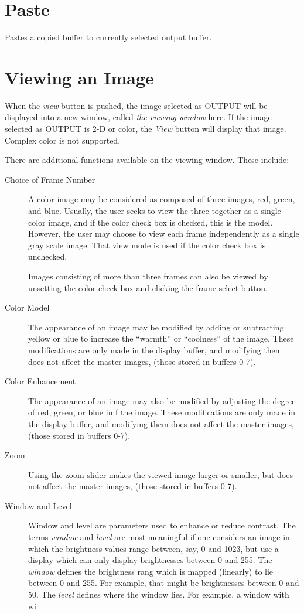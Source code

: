 \documentclass[11pt]{amsart}
\begin{document}
\section{Paste}
Pastes a copied buffer to currently selected output buffer.
\section{Viewing an Image}
When the {\em view} button is pushed, the image selected as OUTPUT will be displayed into a new window, called {\em the viewing window} here. 
If the image selected as OUTPUT is 2-D or color, the {\em View} button will display that image. Complex color is not supported.

There are additional functions available on the viewing window. 
These include:
\begin{description}
\item[Choice of Frame Number] A color image may be considered as composed of three images, red, green, and blue. Usually, the user seeks to view the three together as a single color image, and if the color check box is checked, this is the model.  However, the user may choose to view each frame independently as a single gray scale image. That view mode is used if the color check box is unchecked. 

Images consisting of more than three frames can also be viewed by unsetting the color check box and clicking the frame select button.
\item[Color Model] The appearance of an image may be modified by  adding or  subtracting yellow or blue to increase the ``warmth'' or ``coolness'' of the image. These modifications are only made in the display buffer, and modifying them does not affect the master images, (those stored in buffers 0-7).
\item [Color Enhancement]
The appearance of an image may also be modified by  adjusting the degree of red, green, or blue in  f the image. These modifications are only made in the display buffer, and modifying them does not affect the master images, (those stored in buffers 0-7).

\item[Zoom] Using the zoom slider makes the viewed image larger or smaller, but does not affect the master images, (those stored in buffers 0-7).
\item[Window and Level]
Window and level are parameters used to enhance or reduce contrast. The terms {\em window} and {\em level} are most meaningful if one considers an image in which the brightness values range between, say, 0 and 1023, but use a display which can only display brightnesses between 0 and 255. The {\em window} defines the brightness rang which is mapped (linearly) to lie between 0 and 255. For example, that might be brightnesses between 0 and 50. The {\em level} defines where the window lies. For example, a window with wi
\end{description}
\end{document}
